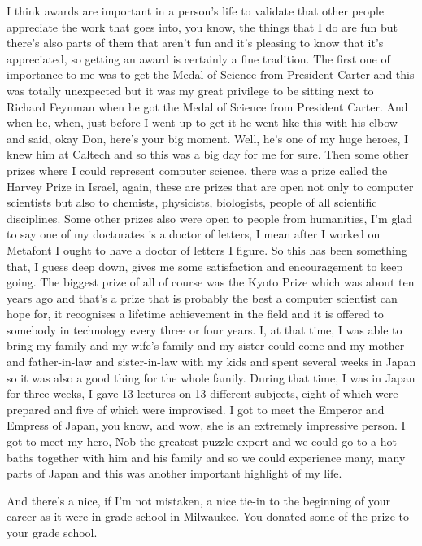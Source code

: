 \documentclass[]{article}
\begin{document}
I think awards are important in a person's life to validate that other
people appreciate the work that goes into, you know, the things that I
do are fun but there's also parts of them that aren't fun and it's
pleasing to know that it's appreciated, so getting an award is certainly
a fine tradition. The first one of importance to me was to get the Medal
of Science from President Carter and this was totally unexpected but it
was my great privilege to be sitting next to Richard Feynman when he got
the Medal of Science from President Carter. And when he, when, just
before I went up to get it he went like this with his elbow and said,
okay Don, here's your big moment. Well, he's one of my huge heroes, I
knew him at Caltech and so this was a big day for me for sure. Then some
other prizes where I could represent computer science, there was a prize
called the Harvey Prize in Israel, again, these are prizes that are open
not only to computer scientists but also to chemists, physicists,
biologists, people of all scientific disciplines. Some other prizes also
were open to people from humanities, I'm glad to say one of my
doctorates is a doctor of letters, I mean after I worked on Metafont I
ought to have a doctor of letters I figure. So this has been something
that, I guess deep down, gives me some satisfaction and encouragement to
keep going. The biggest prize of all of course was the Kyoto Prize which
was about ten years ago and that's a prize that is probably the best a
computer scientist can hope for, it recognises a lifetime achievement in
the field and it is offered to somebody in technology every three or
four years. I, at that time, I was able to bring my family and my wife's
family and my sister could come and my mother and father-in-law and
sister-in-law with my kids and spent several weeks in Japan so it was
also a good thing for the whole family. During that time, I was in Japan
for three weeks, I gave 13 lectures on 13 different subjects, eight of
which were prepared and five of which were improvised. I got to meet the
Emperor and Empress of Japan, you know, and wow, she is an extremely
impressive person. I got to meet my hero, Nob the greatest puzzle expert
and we could go to a hot baths together with him and his family and so
we could experience many, many parts of Japan and this was another
important highlight of my life.

And there's a nice, if I'm not mistaken, a nice tie-in to the beginning
of your career as it were in grade school in Milwaukee. You donated some
of the prize to your grade school.
\end{document}
